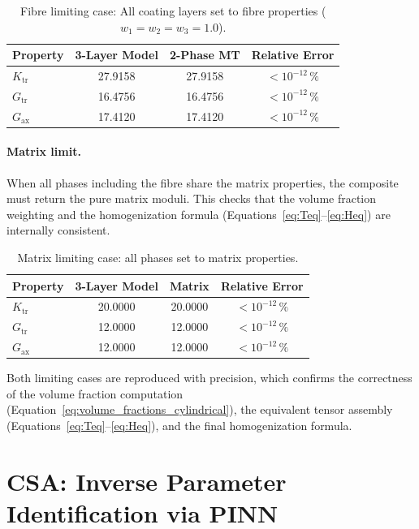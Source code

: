 \documentclass[oneside, 12pt, a4paper, bibliography=totoc]{book}
\begin{document}
\begin{table}[htbp]
\centering
\caption{Fibre limiting case: All coating layers set to fibre properties ($w_1 = w_2 = w_3 = 1.0$).}
\label{tab:limiting_fiber}
\begin{tabular}{lccc}
\toprule
Property & 3-Layer Model & 2-Phase MT & Relative Error \\
\midrule
$K_{\text{tr}}$ & 27.9158 & 27.9158 & $< 10^{-12}\,\%$ \\
$G_{\text{tr}}$ & 16.4756 & 16.4756 & $< 10^{-12}\,\%$ \\
$G_{\text{ax}}$ & 17.4120 & 17.4120 & $< 10^{-12}\,\%$ \\
\bottomrule
\end{tabular}
\end{table}

\paragraph{Matrix limit.}
When all phases including the fibre share the matrix properties, the composite must return the pure matrix moduli. This checks that the volume fraction weighting and the homogenization formula (Equations~\eqref{eq:Teq}--\eqref{eq:Heq}) are internally consistent.

\begin{table}[htbp]
\centering
\caption{Matrix limiting case: all phases set to matrix properties.}
\label{tab:limiting_matrix}
\begin{tabular}{lccc}
\toprule
Property & 3-Layer Model & Matrix & Relative Error \\
\midrule
$K_{\text{tr}}$ & 20.0000 & 20.0000 & $< 10^{-12}\,\%$ \\
$G_{\text{tr}}$ & 12.0000 & 12.0000 & $< 10^{-12}\,\%$ \\
$G_{\text{ax}}$ & 12.0000 & 12.0000 & $< 10^{-12}\,\%$ \\
\bottomrule
\end{tabular}
\end{table}

Both limiting cases are reproduced with precision, which confirms the correctness of the volume fraction computation (Equation~\eqref{eq:volume_fractions_cylindrical}), the equivalent tensor assembly (Equations~\eqref{eq:Teq}--\eqref{eq:Heq}), and the final homogenization formula.


\section{CSA: Inverse Parameter Identification via PINN}
\label{sec:csa_results}
\end{document}
